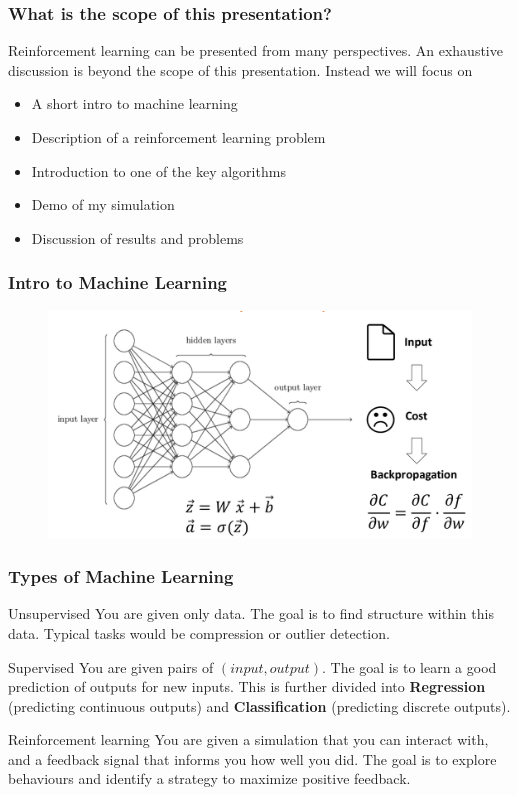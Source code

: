 \documentclass{beamer}
\begin{document}

\begin{frame}
\frametitle{What is the scope of this presentation?}
Reinforcement learning can be presented from many perspectives.
An exhaustive discussion is beyond the scope of this presentation.
Instead we will focus on
\begin{itemize}
\item A short intro to machine learning
\item Description of a reinforcement learning problem
\item Introduction to one of the key algorithms
\item Demo of my simulation
\item Discussion of results and problems
\end{itemize}
\end{frame}

\begin{frame}
\frametitle{Intro to Machine Learning}
\begin{figure}
\includegraphics[height=0.7\textheight]{ml_slide.png}
\end{figure}
\end{frame}


\begin{frame}
\frametitle{Types of Machine Learning}
\begin{block}{Unsupervised}
You are given only data. The goal is to find structure within this data. Typical tasks would be compression or outlier detection.
\end{block}

\begin{block}{Supervised}
You are given pairs of  \((input, output)\). The goal is to learn a good prediction of outputs for new inputs.
This is further divided into \textbf{Regression} (predicting continuous outputs) and \textbf{Classification} (predicting discrete outputs).
\end{block}

\begin{block}{Reinforcement learning}
You are given a simulation that you can interact with, and a feedback signal that informs you how well you did. The goal is to explore behaviours and identify a strategy to maximize positive feedback.
\end{block}
\end{frame}
\end{document}
